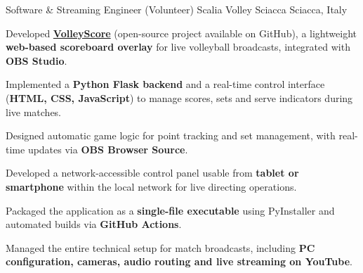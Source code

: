 
\begin{cventries}

  \cventry
    {Software \& Streaming Engineer (Volunteer)}
    {Scalia Volley Sciacca}
    {Sciacca, Italy}
    {}
    {
      \begin{cvitems}
        \item {Developed \href{https://github.com/Reccardenee/VolleyScore}{\textbf{VolleyScore}} (open-source project available on GitHub), a lightweight \textbf{web-based scoreboard overlay} for live volleyball broadcasts, integrated with \textbf{OBS Studio}.}
        \item {Implemented a \textbf{Python Flask backend} and a real-time control interface (\textbf{HTML, CSS, JavaScript}) to manage scores, sets and serve indicators during live matches.}
        \item {Designed automatic game logic for point tracking and set management, with real-time updates via \textbf{OBS Browser Source}.}
        \item {Developed a network-accessible control panel usable from \textbf{tablet or smartphone} within the local network for live directing operations.}
        \item {Packaged the application as a \textbf{single-file executable} using PyInstaller and automated builds via \textbf{GitHub Actions}.}
        \item {Managed the entire technical setup for match broadcasts, including \textbf{PC configuration, cameras, audio routing and live streaming on YouTube}.}
      \end{cvitems}
    }

\end{cventries}
